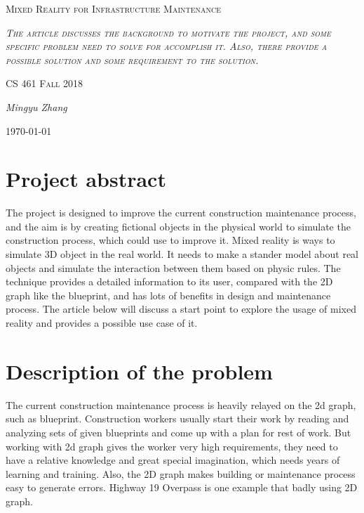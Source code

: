 \documentclass[10pt,letter paper]{article}
\begin{document}
\begin{titlepage}
	\centering
	\vspace{8cm}
	{\scshape\huge Mixed Reality for Infrastructure Maintenance \par}
	\vspace{2cm}
	{\scshape\itshape The article discusses the background to motivate the project, and some specific problem need to solve for accomplish it. Also, there provide a possible solution and some requirement to the solution.
\par}
	\vspace{1.5cm}
	{\scshape\Large CS 461 Fall 2018\par}
	\vspace{1.5cm}
	{\Large\itshape Mingyu Zhang\par}
	\vspace{1.5cm}


	{\large \today\par}
\end{titlepage}
\section*{Project abstract }\bigskip
	The project is designed to improve the current construction maintenance process, and the aim is by creating fictional objects in the physical world to simulate the construction process, which could use to improve it. Mixed reality is ways to simulate 3D object in the real world. It needs to make a stander model about real objects and simulate the interaction between them based on physic rules. The technique provides a detailed information to its user, compared with the 2D graph like the blueprint, and has lots of benefits in design and maintenance process. The article below will discuss a start point to explore the usage of mixed reality and provides a possible use case of it.
	
\section*{Description of the problem}
    \bigskip
    The current construction maintenance process is heavily relayed on the 2d graph, such as blueprint. Construction workers usually start their work by reading and analyzing sets of given blueprints and come up with a plan for rest of work. But working with 2d graph gives the worker very high requirements, they need to have a relative knowledge and great special imagination, which needs years of learning and training. Also, the 2D graph makes building or maintenance process easy to generate errors. Highway 19 Overpass is one example that badly using 2D graph. \newline \par
    
\end{document}
